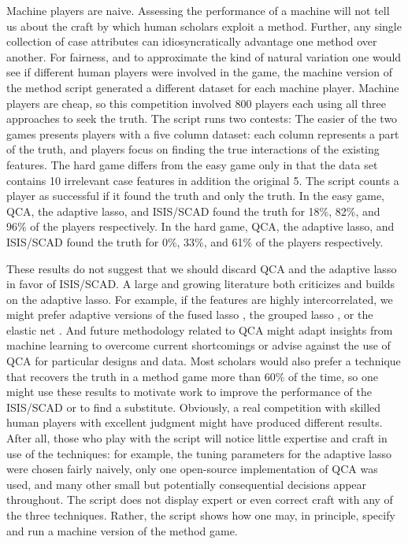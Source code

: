 \documentclass[12pt]{article}
\begin{document}
Machine players are naive. Assessing the performance of a machine will not
tell us about the craft by which human scholars exploit a method.  Further,
any single collection of case attributes can idiosyncratically advantage one
method over another. For fairness, and to approximate the kind of natural
variation one would see if different human players were involved in the game,
the machine version of the method script generated a different dataset
for each machine player.  Machine players are cheap, so this competition
involved 800 players each using all three approaches to seek the truth.  The
script runs two contests: The easier of the two games presents players with a
five column dataset: each column represents a part of the truth, and players
focus on finding the true interactions of the existing features.  The hard
game differs from the easy game only in that the data set contains 10
irrelevant case features in addition the original 5.  The script counts a
player as successful if it found the truth and only the truth. In the easy
game, QCA, the adaptive lasso, and ISIS/SCAD found the truth for 18\%, 82\%,
and 96\% of the players respectively. In the hard game, QCA, the adaptive
lasso, and ISIS/SCAD found the truth for 0\%, 33\%, and 61\% of the players
respectively.

These results do not suggest that we should discard QCA and the adaptive lasso
in favor of ISIS/SCAD.  A large and growing literature both criticizes and
builds on the adaptive lasso. For example, if the features are highly
intercorrelated, we might prefer adaptive versions of the fused lasso
\citep{rinaldo2009properties}, the grouped lasso \citep{wang2008note}, or the
elastic net \citep{ghosh2011grouped, zou2004regression}. And future
methodology related to QCA might adapt insights from machine learning to
overcome current shortcomings or advise against the use of QCA for particular
designs and data.  Most scholars would also prefer a technique
that recovers the truth in a method game more than 60\% of the time, so one might
use these results to motivate work to improve the performance of the ISIS/SCAD
or to find a substitute. Obviously, a real competition with skilled human players
with excellent judgment might have produced different results.  After all,
those who play with the script will notice little expertise and craft in use
of the techniques: for example, the tuning parameters for the adaptive lasso
were chosen fairly naively, only one open-source implementation of QCA was
used, and many other small but potentially consequential decisions appear
throughout.  The script does not display expert or even correct craft with any
of the three techniques.  Rather, the script shows how one may, in principle,
specify and run a machine version of the method game.
\end{document}
